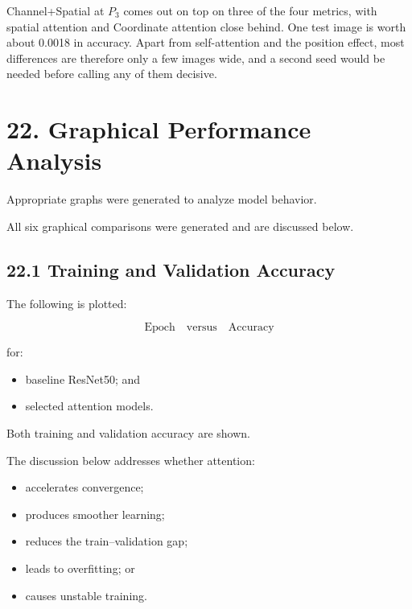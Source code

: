 \documentclass[10pt]{article}
\begin{document}
Channel+Spatial at $P_3$ comes out on top on three of the four metrics, with
spatial attention and Coordinate attention close behind. One test image is worth
about 0.0018 in accuracy. Apart from self-attention and the position effect,
most differences are therefore only a few images wide, and a second seed would
be needed before calling any of them decisive.

\section*{22. Graphical Performance Analysis}

Appropriate graphs were generated to analyze model behavior.

All six graphical comparisons were generated and are discussed below.

\subsection*{22.1 Training and Validation Accuracy}

The following is plotted:

\[
\text{Epoch}
\quad\text{versus}\quad
\text{Accuracy}
\]

for:

\begin{itemize}

\item baseline ResNet50; and

\item selected attention models.

\end{itemize}

Both training and validation accuracy are shown.

The discussion below addresses whether attention:

\begin{itemize}

\item accelerates convergence;

\item produces smoother learning;

\item reduces the train--validation gap;

\item leads to overfitting; or

\item causes unstable training.

\end{itemize}
\end{document}
